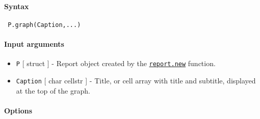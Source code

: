 


	\paragraph{Syntax}
 
 \begin{verbatim}
 P.graph(Caption,...)
 \end{verbatim}
 
 \paragraph{Input arguments}
 
 \begin{itemize}
 \item
   \texttt{P} {[} struct {]} - Report object created by the
   \href{report/new}{\texttt{report.new}} function.
 \item
   \texttt{Caption} {[} char \textbar{} cellstr {]} - Title, or cell
   array with title and subtitle, displayed at the top of the graph.
 \end{itemize}
 
 \paragraph{Options}
 

